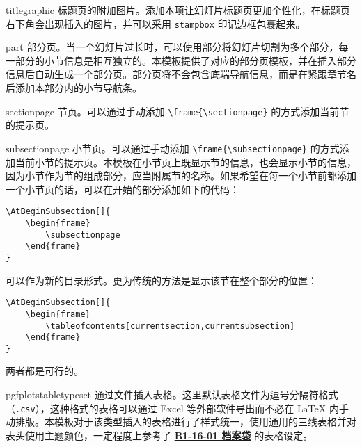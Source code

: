 \documentclass[a4paper,12pt]{article}
\begin{document}
\begin{CJK}{UTF8}{song}
\begin{docCommand*}[]{titlegraphic}{}
    标题页的附加图片。添加本项让幻灯片标题页更加个性化，在标题页右下角会出现插入的图片，并可以采用 \verb"stampbox" 印记边框包裹起来。
\end{docCommand*}

\begin{docCommand*}[]{part}{}
    部分页。当一个幻灯片过长时，可以使用部分将幻灯片切割为多个部分，每一部分的小节信息是相互独立的。本模板提供了对应的部分页模板，并在插入部分信息后自动生成一个部分页。部分页将不会包含底端导航信息，而是在紧跟章节名后添加本部分内的小节导航条。
\end{docCommand*}

\begin{docCommand*}[]{sectionpage}{}
    节页。可以通过手动添加 \verb"\frame{\sectionpage}" 的方式添加当前节的提示页。
\end{docCommand*}

\begin{docCommand*}[]{subsectionpage}{}
    小节页。可以通过手动添加 \verb"\frame{\subsectionpage}" 的方式添加当前小节的提示页。本模板在小节页上既显示节的信息，也会显示小节的信息，因为小节作为节的组成部分，应当附属节的名称。如果希望在每一个小节前都添加一个小节页的话，可以在开始的部分添加如下的代码：
    \begin{verbatim}
\AtBeginSubsection[]{
    \begin{frame}
        \subsectionpage
    \end{frame}
}\end{verbatim}
    可以作为新的目录形式。更为传统的方法是显示该节在整个部分的位置：
    \begin{verbatim}
\AtBeginSubsection[]{
    \begin{frame}
        \tableofcontents[currentsection,currentsubsection]
    \end{frame}
}\end{verbatim}
    两者都是可行的。
\end{docCommand*}

\begin{docCommand*}[]{pgfplotstabletypeset}{}
    通过文件插入表格。这里默认表格文件为逗号分隔符格式（\verb".csv"），这种格式的表格可以通过 Excel 等外部软件导出而不必在 \LaTeX{} 内手动排版。本模板对于该类型插入的表格进行了样式统一，使用通用的三线表格并对表头使用主题颜色，一定程度上参考了 \href{https://vi.sjtu.edu.cn/index.php/articles/app/7}{\textbf{B1-16-01 档案袋}} 的表格设定。
\end{docCommand*}


\end{CJK}
\end{document}
